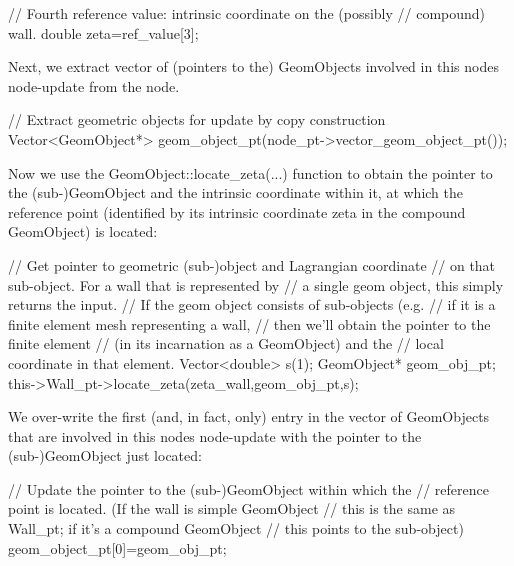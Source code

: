 \begin{DoxyCodeInclude}
 \textcolor{comment}{// Fourth reference value: intrinsic coordinate on the (possibly }
 \textcolor{comment}{// compound) wall.}
 \textcolor{keywordtype}{double} zeta=ref\_value[3]; 

\end{DoxyCodeInclude}


Next, we extract vector of (pointers to the) {\ttfamily Geom\+Objects} involved in this node\textquotesingle{}s node-\/update from the node.


\begin{DoxyCodeInclude}
 \textcolor{comment}{// Extract geometric objects for update by copy construction}
 Vector<GeomObject*> geom\_object\_pt(node\_pt->vector\_geom\_object\_pt());

\end{DoxyCodeInclude}


Now we use the {\ttfamily Geom\+Object\+::locate\+\_\+zeta}(...) function to obtain the pointer to the (sub-\/){\ttfamily Geom\+Object} and the intrinsic coordinate within it, at which the reference point (identified by its intrinsic coordinate {\ttfamily zeta} in the compound {\ttfamily Geom\+Object}) is located\+:


\begin{DoxyCodeInclude}
 \textcolor{comment}{// Get pointer to geometric (sub-)object and Lagrangian coordinate}
 \textcolor{comment}{// on that sub-object. For a wall that is represented by }
 \textcolor{comment}{// a single geom object, this simply returns the input.}
 \textcolor{comment}{// If the geom object consists of sub-objects (e.g. }
 \textcolor{comment}{// if it is a finite element mesh representing a wall,}
 \textcolor{comment}{// then we'll obtain the pointer to the finite element}
 \textcolor{comment}{// (in its incarnation as a GeomObject) and the}
 \textcolor{comment}{// local coordinate in that element.}
 Vector<double> s(1);
 GeomObject* geom\_obj\_pt;
 this->Wall\_pt->locate\_zeta(zeta\_wall,geom\_obj\_pt,s);

\end{DoxyCodeInclude}


We over-\/write the first (and, in fact, only) entry in the vector of {\ttfamily Geom\+Objects} that are involved in this node\textquotesingle{}s node-\/update with the pointer to the (sub-\/){\ttfamily Geom\+Object} just located\+:


\begin{DoxyCodeInclude}
 \textcolor{comment}{// Update the pointer to the (sub-)GeomObject within which the}
 \textcolor{comment}{// reference point is located. (If the wall is simple GeomObject}
 \textcolor{comment}{// this is the same as Wall\_pt; if it's a compound GeomObject}
 \textcolor{comment}{// this points to the sub-object)}
 geom\_object\_pt[0]=geom\_obj\_pt; 

\end{DoxyCodeInclude}


